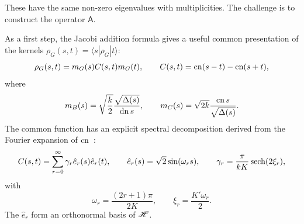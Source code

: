 These have the same non-zero eigenvalues with multiplicities. The challenge is
to construct the operator $\mathsf A$.

As a first step, the Jacobi addition formula gives a useful common presentation
of the kernels $\rho_G(s,t)=\langle s|\rho_G|t\rangle$:
\begin{equation}
  \rho_G(s,t)=m_G(s)C(s,t)m_G(t),\qquad
  C(s,t)=\operatorname{cn}(s-t)-\operatorname{cn}(s+t),
  \label{eq:common-kernel}
\end{equation}
where
\begin{equation}
  m_B(s)=\sqrt{\frac{k}{2}}\frac{\sqrt{\Delta(s)}}{\operatorname{dn} s},
  \qquad m_C(s)=\sqrt{2k}\frac{\operatorname{cn} s}{\sqrt{\Delta(s)}}.
\end{equation}
The common function has an explicit spectral decomposition derived from the
Fourier expansion of $\operatorname{cn}$~\cite[\S22.11]{DLMF}:
\begin{equation}
  \begin{gathered}
    C(s,t)=\sum_{r=0}^{\infty}\gamma_r\hat{e}_r(s)\hat{e}_r(t),\qquad
    \hat{e}_r(s)=\sqrt{2}\sin(\omega_rs),\qquad
    \gamma_r=\frac{\pi}{kK}\operatorname{sech}(2\xi_r),
  \end{gathered}
  \label{eq:convolution-series}
\end{equation}
with
\begin{equation}
  \omega_r=\frac{(2r+1)\pi}{2K},\qquad
  \xi_r=\frac{K'\omega_r}{2}.
\end{equation}
The $\hat{e}_r$ form an orthonormal basis of $\mathscr H$.

